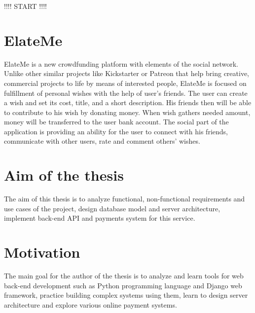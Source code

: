 !!!! START !!!!


\section{ElateMe}
ElateMe is a new crowdfunding platform with elements of the social network. Unlike other similar projects like
Kickstarter or Patreon that help bring creative, commercial projects to life by means of interested people, ElateMe
is focused on fulfillment of personal wishes with the help of user’s friends. The user can create a wish and set
its cost, title, and a short description. His friends then will be able to contribute to his wish by donating money.
When wish gathers needed amount, money will be transferred to the user bank account. The social part of the
application is providing an ability for the user to connect with his friends, communicate with other users,
rate and comment others’ wishes.

\section{Aim of the thesis}
The aim of this thesis is to analyze functional, non-functional requirements and use cases of the project, design
database model and server architecture, implement back-end \ac{API} and payments system for this service.

\section{Motivation}
The main goal for the author of the thesis is to analyze and learn tools for web back-end development such as Python
programming language and Django web framework, practice building complex systems using them, learn to design server
architecture and explore various online payment systems.
